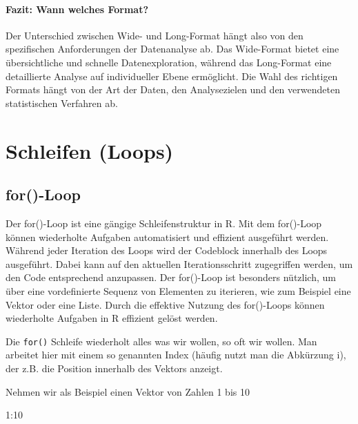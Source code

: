 \documentclass[
]{book}
\newenvironment{Shaded}{\begin{snugshade}}{\end{snugshade}}
\newcommand{\DecValTok}[1]{\textcolor[rgb]{0.00,0.00,0.81}{#1}}
\newcommand{\SpecialCharTok}[1]{\textcolor[rgb]{0.00,0.00,0.00}{#1}}
\begin{document}
\hypertarget{fazit-wann-welches-format}{%
\subsubsection{Fazit: Wann welches Format?}\label{fazit-wann-welches-format}}

Der Unterschied zwischen Wide- und Long-Format hängt also von den spezifischen Anforderungen der Datenanalyse ab. Das Wide-Format bietet eine übersichtliche und schnelle Datenexploration, während das Long-Format eine detaillierte Analyse auf individueller Ebene ermöglicht. Die Wahl des richtigen Formats hängt von der Art der Daten, den Analysezielen und den verwendeten statistischen Verfahren ab.

\hypertarget{schleifen-loops}{%
\chapter{Schleifen (Loops)}\label{schleifen-loops}}

\hypertarget{for-loop}{%
\section{for()-Loop}\label{for-loop}}

Der for()-Loop ist eine gängige Schleifenstruktur in R. Mit dem for()-Loop können wiederholte Aufgaben automatisiert und effizient ausgeführt werden.
Während jeder Iteration des Loops wird der Codeblock innerhalb des Loops ausgeführt. Dabei kann auf den aktuellen Iterationsschritt zugegriffen werden, um den Code entsprechend anzupassen. Der for()-Loop ist besonders nützlich, um über eine vordefinierte Sequenz von Elementen zu iterieren, wie zum Beispiel eine Vektor oder eine Liste. Durch die effektive Nutzung des for()-Loops können wiederholte Aufgaben in R effizient gelöst werden.

Die \texttt{for()} Schleife wiederholt alles was wir wollen, so oft wir wollen. Man arbeitet hier mit einem so genannten Index (häufig nutzt man die Abkürzung i), der z.B. die Position innerhalb des Vektors anzeigt.

Nehmen wir als Beispiel einen Vektor von Zahlen 1 bis 10

\begin{Shaded}
\begin{Highlighting}[]
\DecValTok{1}\SpecialCharTok{:}\DecValTok{10}
\end{Highlighting}
\end{Shaded}
\end{document}
